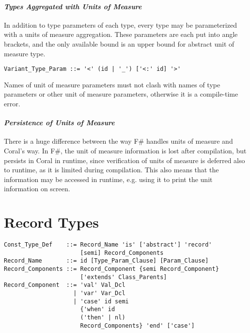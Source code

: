 \paragraph{\em Types Aggregated with Units of Measure}
In addition to type parameters of each type, every type may be parameterized with a units of measure aggregation. These parameters are each put into angle brackets, and the only available bound is an upper bound for abstract unit of measure type. 

\syntax\begin{lstlisting}[mathescape=false]
Variant_Type_Param ::= '<' (id | '_') ['<:' id] '>'
\end{lstlisting}

Names of unit of measure parameters must not clash with names of type parameters or other unit of measure parameters, otherwise it is a compile-time error. 

\paragraph{\em Persistence of Units of Measure}
There is a huge difference between the way F\# handles units of measure and Coral's way. In F\#, the unit of measure information is lost after compilation, but persists in Coral in runtime, since verification of units of measure is deferred also to runtime, as it is limited during compilation. This also means that the information may be accessed in runtime, e.g. using it to print the unit information on screen.






\section{Record Types}
\label{sec:record-types}

\syntax\begin{lstlisting}
Const_Type_Def    ::= Record_Name 'is' ['abstract'] 'record'
                      [semi] Record_Components
Record_Name       ::= id [Type_Param_Clause] [Param_Clause]
Record_Components ::= Record_Component {semi Record_Component}
                      ['extends' Class_Parents]
Record_Component  ::= 'val' Val_Dcl
                    | 'var' Var_Dcl
                    | 'case' id semi 
                      {'when' id 
                      ('then' | nl) 
                      Record_Components} 'end' ['case']
\end{lstlisting}

